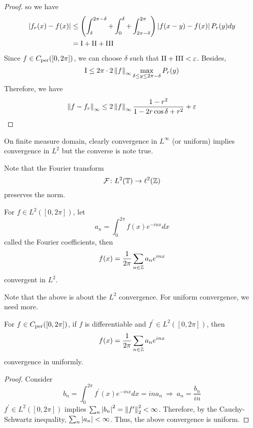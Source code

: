\begin{enumerate}[label=\arabic*.]
\begin{proof}
		so we have
		\begin{equation*}
			\begin{aligned}
				\abs{f_r(x) - f(x)} &\leq \bc{\int_\delta^{2\pi-\delta}+\int_0^{\delta}+\int_{2\pi-\delta}^{2\pi}}\abs{f(x-y)-f(x)}P_r(y)dy\\
				&=\text{\RNum{1}}+\text{\RNum{2}}+\text{\RNum{3}}
			\end{aligned}
		\end{equation*}
		Since $f \in C_{\operatorname{per}}([0,2\pi])$, we can choose $\delta$ such that $\text{\RNum{2}}+\text{\RNum{3}} < \varepsilon$. Besides, 
		\begin{equation*}
			\text{\RNum{1}} \leq 2\pi \cdot 2 \norm{f}_{\infty} \max_{\delta\leq y \leq 2\pi-\delta} P_r(y)
		\end{equation*}
		Therefore, we have
		\begin{equation*}
			\left\lVert f-f_r\right\lVert_\infty \leq 2 \left\lVert f\right\lVert_{\infty} \frac{1-r^2}{1-2r\cos \delta +r^2} + \varepsilon
		\end{equation*}
	\end{proof}
	\begin{rmk}
		On finite measure domain, clearly convergence in $L^{\infty}$ (or uniform) implies convergence in $L^2$ but the converse is note true.
	\end{rmk}
	\begin{rmk}
		Note that the Fourier transform
		\begin{equation*}
			\mathcal{F} \colon L^2(\mathbb{T}) \rightarrow \ell^2(\mathbb{Z})
		\end{equation*}
		preserves the norm.
	\end{rmk}
	\begin{cor}
		For $f \in L^2([0,2\pi])$, let
		\begin{equation*}
			a_n = \int_0^{2\pi}f(x)e^{-inx}dx
		\end{equation*}
		called the Fourier coefficients, then
		\begin{equation*}
			f(x) = \frac{1}{2\pi}\sum_{n \in \mathbb{Z}}a_ne^{inx}
		\end{equation*}
		convergent in $L^2$.
	\end{cor}
	Note that the above is about the $L^2$ convergence. For uniform convergence, we need more.

	\begin{prop}
		For $f \in C_{\operatorname{per}}([0,2\pi])$, if $f$ is differentiable and $f^\prime \in L^2([0,2\pi])$, then
		\begin{equation*}
			f(x) = \frac{1}{2\pi}\sum_{n \in \mathbb{Z}}a_ne^{inx}
		\end{equation*}
		convergence in uniformly.
	\end{prop}
	\begin{proof}
		Consider 
		\begin{equation*}
			b_n = \int_0^{2\pi}f^\prime(x)e^{-inx}dx = in a_n~\Rightarrow~a_n = \frac{b_n}{in}
		\end{equation*}
		$f^\prime \in L^2([0,2\pi])$ implies $\sum_n \left\lvert b_n\right\lvert^2 = \left\lVert f^\prime\right\lVert_2^2 < \infty$. Therefore, by the Cauchy-Schwartz inequality, $\sum_n\left\lvert a_n\right\lvert < \infty$. Thus, the above convergence is uniform.
	\end{proof}


\end{enumerate}
